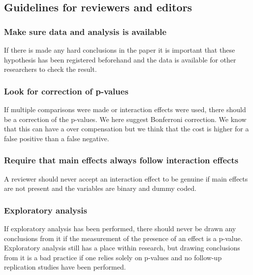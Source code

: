 \subsection{Guidelines for reviewers and editors}

\subsubsection{Make sure data and analysis is available}
If there is made any hard conclusions in the paper it is important that these hypothesis has been registered beforehand and the data is available for other researchers to check the result. 
\subsubsection{Look for correction of p-values}
If multiple comparisons were made or interaction effects were used, there should be a correction of the p-values. We here suggest Bonferroni correction. We know that this can have a over compensation but we think that the cost is higher for a false positive than a false negative. 
\subsubsection{Require that main effects always follow interaction effects}
A reviewer should never accept an interaction effect to be genuine if main effects are not present and the variables are binary and dummy coded. 
\subsubsection{Exploratory analysis}
If exploratory analysis has been performed, there should never be drawn any conclusions from it if the measurement of the presence of an effect is a p-value. Exploratory analysis still has a place within research, but drawing conclusions from it is a bad practice if one relies solely on p-values and no follow-up replication studies have been performed.  

